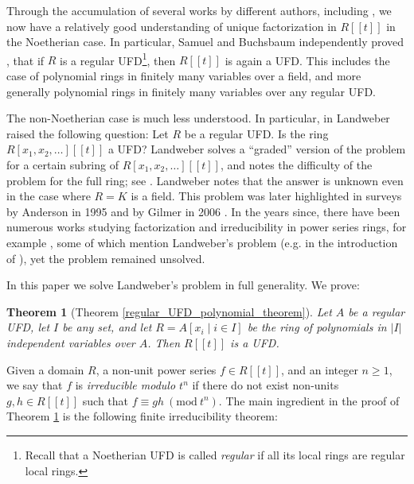 \documentclass{article}
\newcommand{\Mod}[1]{\ (\mathrm{mod}\ #1)}
\theoremstyle{plain}
\theoremstyle{definition}
\theoremstyle{remark}
\newcounter{lthm}
\theoremstyle{plain}
\newtheorem{letterthm}[lthm]{Theorem}
\begin{document}
Through the accumulation of several works by different authors, including \cite{Samuel61,Buchsbaum61,Claborn65,Danilov65,Grothendieck68,Salmon64,HartshorneOgus74,Lipman75}, we now have a relatively good understanding of unique factorization in $R[[t]]$ in the Noetherian case. In particular, Samuel and Buchsbaum independently proved \cite[Theorem 2.1]{Samuel61}, \cite[Theorem 3.2]{Buchsbaum61} that if $R$ is a regular UFD\footnote{Recall that a Noetherian UFD is called {\it regular} if all its local rings are regular local rings.}, then $R[[t]]$ is again a UFD. This includes the case of polynomial rings in finitely many variables over a field, and more generally polynomial rings in finitely many variables over any regular UFD.

The non-Noetherian case is much less understood. In particular, in \cite{Landweber74} Landweber raised the following question: Let $R$ be a regular UFD. Is the ring $R[x_1,x_2,\ldots][[t]]$ a UFD? Landweber solves a ``graded'' version of the problem for a certain subring of $R[x_1,x_2,\ldots][[t]]$, and notes the difficulty of the problem for the full ring; see \cite[Remark 3.9]{Landweber74}. Landweber notes that the answer is unknown even in the case where $R = K$ is a field. This problem was later highlighted in surveys by Anderson in 1995 \cite{Anderson95} and by Gilmer in 2006 \cite{Gilmer06Questions}. In the years since, there have been numerous works studying factorization and irreducibility in power series rings, for example \cite{PS06,BGW07,BG08,KangOh09,BGW12,BGW14,BGW14b,Elliott14,DS21,GTV25}, some of which mention Landweber's problem (e.g. in the introduction of \cite{Elliott14}), yet the problem remained unsolved.

In this paper we solve Landweber's problem in full generality. We prove:

\begin{letterthm}[Theorem \ref{regular_UFD_polynomial_theorem}]\label{main_theorem}
Let $A$ be a regular UFD, let $I$ be any set, and let $R=A[x_i\mid i\in I]$ be the ring of polynomials in $|I|$ independent variables over $A$. Then $R[[t]]$ is a UFD.
\end{letterthm}

Given a domain $R$, a non-unit power series $f\in R[[t]]$, and an integer $n\geq 1$, we say that $f$ is \emph{irreducible modulo $t^n$} if there do not exist non-units $g,h\in R[[t]]$ such that $f\equiv gh \Mod{t^n}$. The main ingredient in the proof of Theorem \ref{main_theorem} is the following finite irreducibility theorem:
\end{document}
